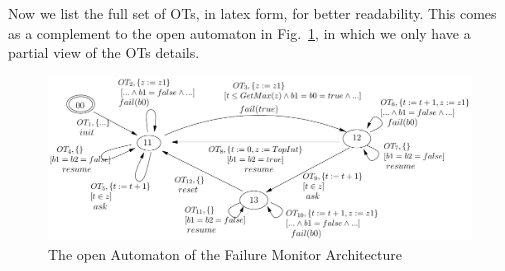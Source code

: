 \documentclass{llncs}
\newcommand{\fig}[1]{Fig.~\ref{fig:#1}}
\begin{document}






Now we list the full set of OTs, in latex form, for better
readability. This comes as a complement to the open automaton in
\fig{ArchFailure:OA-annex}, in which we only have a partial view
of the OTs details.

\begin{figure}[t]
  \centering
  \includegraphics[width=\columnwidth]{TimerOAFullDetailed}
  \caption{The open Automaton of the Failure Monitor Architecture}
  \label{fig:ArchFailure:OA-annex}
\end{figure}
\end{document}
